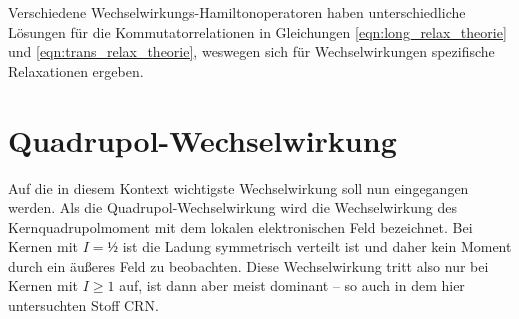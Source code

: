 Verschiedene Wechselwirkungs-Hamiltonoperatoren haben unterschiedliche Lösungen für die Kommutatorrelationen in Gleichungen \eqref{eqn:long_relax_theorie} und \eqref{eqn:trans_relax_theorie}, weswegen sich für Wechselwirkungen spezifische Relaxationen ergeben.





\section{Quadrupol-Wechselwirkung} \label{section:theo:qww}

Auf die in diesem Kontext wichtigste Wechselwirkung soll nun eingegangen werden. Als die Quadrupol-Wechselwirkung wird die Wechselwirkung des Kernquadrupolmoment mit dem lokalen elektronischen Feld bezeichnet. Bei Kernen mit $I = ½$ ist die Ladung symmetrisch verteilt ist und daher kein Moment durch ein äußeres Feld zu beobachten. Diese Wechselwirkung tritt also nur bei Kernen mit $I \ge 1$ auf, ist dann aber meist dominant -- so auch in dem hier untersuchten Stoff CRN.

